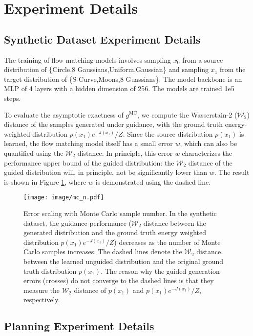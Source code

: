 \section{Experiment Details}
\label{app:exp}

\subsection{Synthetic Dataset Experiment Details}
\label{app:exp_toy}

The training of flow matching models involves sampling $x_0$ from a source distribution of \{Circle,8 Gaussians,Uniform,Gaussian\} and sampling $x_1$ from the target distribution of \{S-Curve,Moons,8 Guassians\}. The model backbone is an MLP of 4 layers with a hidden dimension of 256. The models are trained 1e5 steps. 


To evaluate the asymptotic exactness of $g^{\text{MC}}$, we compute the Wasserstain-2 ($\mathcal{W}_2$) distance of the samples generated under guidance, with the ground truth energy-weighted distribution $p(x_1)e^{-J(x_1)} / Z$. Since the source distribution $p(x_1)$ is learned, the flow matching model itself has a small error $w$, which can also be quantified using the $\mathcal{W}_2$ distance. In principle, this error $w$ characterizes the performance upper bound of the guided distribution: the $\mathcal{W}_2$ distance of the guided distribution will, in principle, not be significantly lower than $w$. The result is shown in Figure \ref{fig:asymptotic}, where $w$ is demonstrated using the dashed line.
\begin{figure}[!htb]
    \centering
    \texttt{[image: image/mc\_n.pdf]}
    \caption{Error scaling with Monte Carlo sample number. In the synthetic dataset, the guidance performance ($\mathcal{W}_2$ distance between the generated distribution and the ground truth energy weighted distribution $p(x_1)e^{-J(x_1)} / Z$) decreases as the number of Monte Carlo samples increases. The dashed lines denote the $\mathcal{W}_2$ distance between the learned unguided distribution and the original ground truth distribution $p(x_1)$. The reason why the guided generation errors (crosses) do not converge to the dashed lines is that they measure the $\mathcal{W}_2$ distance of $p(x_1)$ and $p(x_1)e^{-J(x_1)} / Z$, respectively.}
    \label{fig:asymptotic}
\end{figure}

\subsection{Planning Experiment Details}
\label{app:exp_rl}
